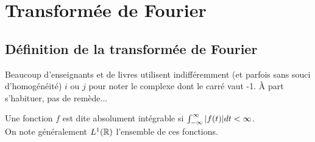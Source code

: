 \chapter{Transformée de Fourier}


%





\section{Définition de la transformée de Fourier}

\begin{remark}

Beaucoup d'enseignants et de livres utilisent indifféremment (et
parfois sans souci d'homogénéité) $i$ ou $j$ pour noter le complexe
dont le carré vaut -1. \`A part s'habituer, pas de remède...

\end{remark}

\begin{definition}
Une fonction $f$ est dite absolument intégrable si $\int_{-\infty}^{\infty} |f(t)|dt<\infty$. \\ On note généralement $L^1(\mathbb{R})$ l'ensemble de ces fonctions.


\end{definition}


